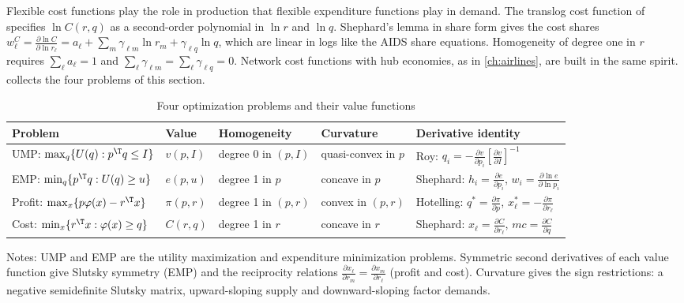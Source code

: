 Flexible cost functions play the role in production that flexible expenditure functions play in demand.
The translog cost function of \citet{ChristensenJorgensonLau1973} specifies $\ln C(r, q)$ as a second-order
polynomial in $\ln r$ and $\ln q$. Shephard's lemma in share form gives the cost shares
$w^C_\ell = \frac{\partial\ln C}{\partial\ln r_\ell} = a_\ell + \sum_m\gamma_{\ell m}\ln r_m + \gamma_{\ell q}\ln q$, which are
linear in logs like the AIDS share equations. Homogeneity of degree one in $r$ requires
$\sum_\ell a_\ell = 1$ and $\sum_\ell\gamma_{\ell m} = \sum_\ell\gamma_{\ell q} = 0$. Network cost functions with hub
economies, as in \cref{ch:airlines}, are built in the same spirit.  collects the four
problems of this section.

\begin{table}[htbp]
\centering
\caption{Four optimization problems and their value functions}\label{tab:B-duality}
\footnotesize
\begin{tabularx}{\textwidth}{@{}>{\raggedright\arraybackslash}X l l l l@{}}
\toprule
Problem & Value & Homogeneity & Curvature & Derivative identity \\
\midrule
UMP: $\max_q\{U(q) : p^\T q \leq I\}$ & $v(p, I)$ & degree 0 in $(p, I)$ & quasi-convex in $p$ &
  Roy: $q_i = -\frac{\partial v}{\partial p_i}\left[\frac{\partial v}{\partial I}\right]^{-1}$ \\[5pt]
EMP: $\min_q\{p^\T q : U(q) \geq u\}$ & $e(p, u)$ & degree 1 in $p$ & concave in $p$ &
  Shephard: $h_i = \frac{\partial e}{\partial p_i}$, $w_i = \frac{\partial\ln e}{\partial\ln p_i}$ \\[5pt]
Profit: $\max_x\{p\varphi(x) - r^\T x\}$ & $\pi(p, r)$ & degree 1 in $(p, r)$ & convex in $(p, r)$ &
  Hotelling: $q^* = \frac{\partial\pi}{\partial p}$, $x^*_\ell = -\frac{\partial\pi}{\partial r_\ell}$ \\[5pt]
Cost: $\min_x\{r^\T x : \varphi(x) \geq q\}$ & $C(r, q)$ & degree 1 in $r$ & concave in $r$ &
  Shephard: $x_\ell = \frac{\partial C}{\partial r_\ell}$, $mc = \frac{\partial C}{\partial q}$ \\
\bottomrule
\end{tabularx}

\medskip
\begin{minipage}{\textwidth}
\footnotesize Notes: UMP and EMP are the utility maximization and expenditure minimization problems.
Symmetric second derivatives of each value function give Slutsky symmetry (EMP) and the reciprocity
relations $\frac{\partial x_\ell}{\partial r_m} = \frac{\partial x_m}{\partial r_\ell}$ (profit and cost). Curvature
gives the sign restrictions: a negative semidefinite Slutsky matrix, upward-sloping supply and downward-sloping
factor demands.
\end{minipage}
\end{table}

